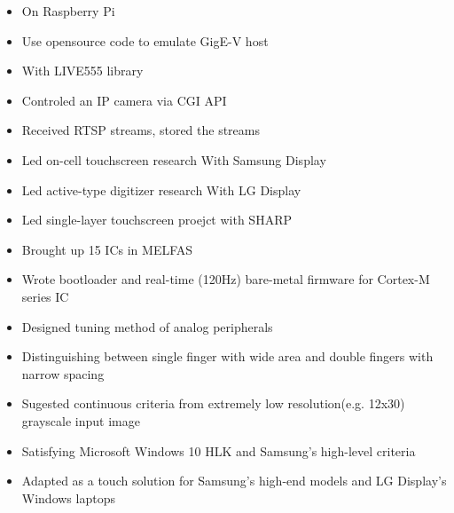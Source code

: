\documentclass[10pt,a4paper,ragged2e,withhyper]{altacv}
\begin{document}
\begin{paracol}{2}
  \divider
 
  \begin{itemize}
    \item On Raspberry Pi
    \item Use opensource code to emulate GigE-V host
  \end{itemize}

  \divider
 
  \begin{itemize}
    \item With LIVE555 library
    \item Controled an IP camera via CGI API
    \item Received RTSP streams, stored the streams
  \end{itemize}

  \divider
 
  \begin{itemize}
    \item Led on-cell touchscreen research With Samsung Display
    \item Led active-type digitizer research With LG Display
    \item Led single-layer touchscreen proejct with SHARP
  \end{itemize}

  \divider

  \begin{itemize}
    \item Brought up 15 ICs in MELFAS
    \item Wrote bootloader and real-time (120Hz) bare-metal firmware for Cortex-M series IC
    \item Designed tuning method of analog peripherals
  \end{itemize}




  \begin{itemize}
  \item Distinguishing between single finger with wide area and double fingers with narrow spacing
  \item Sugested continuous criteria from extremely low resolution(e.g. 12x30) grayscale input image
  \item Satisfying Microsoft Windows 10 HLK and Samsung's high-level criteria
  \item Adapted as a touch solution for Samsung's high-end models and LG Display's Windows laptops 
  \end{itemize}


\end{paracol}
\end{document}
